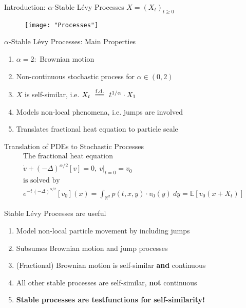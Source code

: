 \documentclass{beamer}
\theoremstyle{plain}
\theoremstyle{definition}
\theoremstyle{remark}
\newcommand{\Rd}{{\mathbb R^d}}
\newcommand{\1}{\mathbbm{1}}
\newcommand{\E}{{\mathbb E}}
\newcommand{\eqfd}{\overset{\mathrm{f.d.}}{=\joinrel=}}
\begin{document}
\begin{frame}{Introduction: $\alpha$-Stable L\'{e}vy Processes $X = (X_t)_{t\geq0}$}
\begin{figure}[h]
 \centering
\texttt{[image: "Processes"]}
\end{figure}
\end{frame}


\begin{frame}{$\alpha$-Stable L\'{e}vy Processes: Main Properties}
\begin{enumerate}
\item $\alpha = 2:$ Brownian motion\\[12pt]
\item Non-continuous stochastic process for $\alpha \in (0,2)$\\[12pt]
\item $X$ is self-similar, i.e. $X_t \ \eqfd \ t^{1/\alpha}  \cdot X_1 $ \\[12pt]
\item Models non-local phenomena, i.e. jumps are involved\\[12pt]
\item Translates fractional heat equation to particle scale
\end{enumerate}
\end{frame}


\begin{frame}{Translation of PDEs to Stochastic Processes}
\begin{gather*}
\text{The fractional heat equation}\\[12pt]
\dot{v} + (-\Delta)^{\alpha/2}[v] = 0, \ v|_{t=0} = v_0\\[12pt]
\text{is solved by}\\[12pt]
e^{-t \, (-\Delta)^{\alpha/2}}[v_0](x) = \int_\Rd p(t,x,y) \cdot v_0(y)\ dy = \E[v_0(x + X_t)]
\end{gather*}
\end{frame}

\begin{frame}{Stable L\'{e}vy Processes are useful}
\begin{enumerate}
\item Model non-local particle movement by including jumps\\[12pt]
\item Subsumes Brownian motion and jump processes\\[12pt]
\item (Fractional) Brownian motion is self-similar \textbf{and} continuous\\[12pt]
\item All other stable processes are self-similar,  \textbf{not} continuous\\[12pt]
\item \textbf{Stable processes are testfunctions for self-similarity!}
\end{enumerate}
\end{frame}
\end{document}

